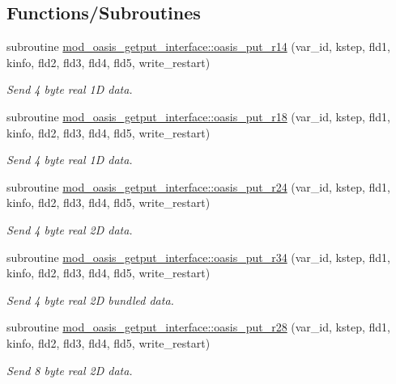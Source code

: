 \subsection*{Functions/\+Subroutines}
\begin{DoxyCompactItemize}
\item 
subroutine \hyperlink{namespacemod__oasis__getput__interface_af2487e50b549830a14e5517c0736f907}{mod\+\_\+oasis\+\_\+getput\+\_\+interface\+::oasis\+\_\+put\+\_\+r14} (var\+\_\+id, kstep, fld1, kinfo, fld2, fld3, fld4, fld5, write\+\_\+restart)
\begin{DoxyCompactList}\small\item\em Send 4 byte real 1D data. \end{DoxyCompactList}\item 
subroutine \hyperlink{namespacemod__oasis__getput__interface_a70e218d2524977cbd4e6c010b6a222cc}{mod\+\_\+oasis\+\_\+getput\+\_\+interface\+::oasis\+\_\+put\+\_\+r18} (var\+\_\+id, kstep, fld1, kinfo, fld2, fld3, fld4, fld5, write\+\_\+restart)
\begin{DoxyCompactList}\small\item\em Send 4 byte real 1D data. \end{DoxyCompactList}\item 
subroutine \hyperlink{namespacemod__oasis__getput__interface_a6b5add4ec9bd054279451a5bb52f7d32}{mod\+\_\+oasis\+\_\+getput\+\_\+interface\+::oasis\+\_\+put\+\_\+r24} (var\+\_\+id, kstep, fld1, kinfo, fld2, fld3, fld4, fld5, write\+\_\+restart)
\begin{DoxyCompactList}\small\item\em Send 4 byte real 2D data. \end{DoxyCompactList}\item 
subroutine \hyperlink{namespacemod__oasis__getput__interface_acc31c8501b46f19ac866726af9baf017}{mod\+\_\+oasis\+\_\+getput\+\_\+interface\+::oasis\+\_\+put\+\_\+r34} (var\+\_\+id, kstep, fld1, kinfo, fld2, fld3, fld4, fld5, write\+\_\+restart)
\begin{DoxyCompactList}\small\item\em Send 4 byte real 2D bundled data. \end{DoxyCompactList}\item 
subroutine \hyperlink{namespacemod__oasis__getput__interface_a73cdc18cf8e76acb003451e737fab7fe}{mod\+\_\+oasis\+\_\+getput\+\_\+interface\+::oasis\+\_\+put\+\_\+r28} (var\+\_\+id, kstep, fld1, kinfo, fld2, fld3, fld4, fld5, write\+\_\+restart)
\begin{DoxyCompactList}\small\item\em Send 8 byte real 2D data. \end{DoxyCompactList}\item 

\end{DoxyCompactItemize}
